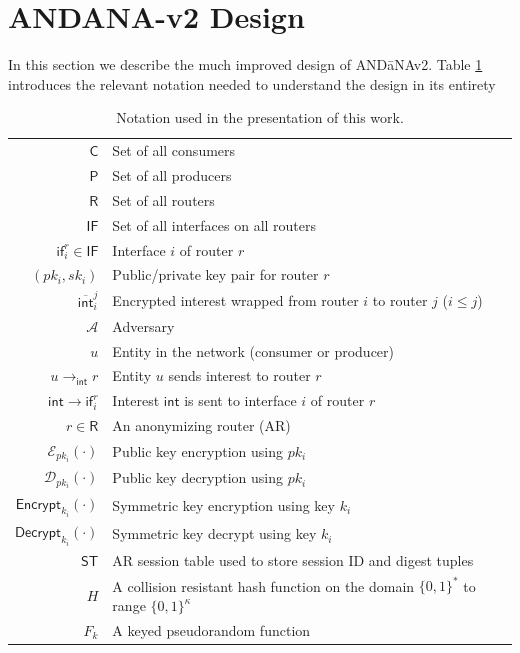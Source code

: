 \section{ANDANA-v2 Design} \label{sec:design}
In this section we describe the much improved design of {\sf AND\=aNAv2}. Table \ref{tab:notation} introduces the relevant notation needed to understand the design in its entirety

\begin{table}
\centering
\caption{Notation used in the presentation of this work.}
\label{tab:notation}
  \begin{tabular}{| r | l |} \hline
  $\mathsf{C}$ & Set of all consumers  \\
  $\mathsf{P}$ & Set of all producers  \\ 
  $\mathsf{R}$ & Set of all routers  \\
  $\mathsf{IF}$ & Set of all interfaces on all routers  \\
  $\mathsf{if}_i^r \in \mathsf{IF}$ & Interface $i$ of router $r$  \\
  $(pk_i, sk_i)$ & Public/private key pair for router $r$  \\
  $\overline{\mathsf{int}}_{i}^{j}$ & Encrypted interest wrapped from router $i$ to router $j$ ($i \leq j$)  \\
  $\mathcal{A}$ & Adversary \\ 
  $u$ & Entity in the network (consumer or producer) \\
  $u \to_{\mathsf{int}} r$ & Entity $u$ sends interest to router $r$  \\ 
  $\mathsf{int} \to \mathsf{if}_i^r$ & Interest $\mathsf{int}$ is sent to interface $i$ of router $r$ \\
  $r \in \mathsf{R}$ & An anonymizing router (AR) \\ 
  $\mathcal{E}_{pk_i}(\cdot)$ & Public key encryption using $pk_i$ \\ 
  $\mathcal{D}_{pk_i}(\cdot)$ & Public key decryption using $pk_i$ \\ 
  $\mathsf{Encrypt}_{k_i}(\cdot)$ & Symmetric key encryption using key $k_i$ \\ 
  $\mathsf{Decrypt}_{k_i}(\cdot)$ & Symmetric key decrypt using key $k_i$ \\ 
  $\mathsf{ST}$ & AR session table used to store session ID and digest tuples \\
  $H$ & A collision resistant hash function on the domain $\{0,1\}^*$ to range $\{0,1\}^{\kappa}$ \\
  $F_k$ & A keyed pseudorandom function \\ \hline
  \end{tabular}
\end{table}

